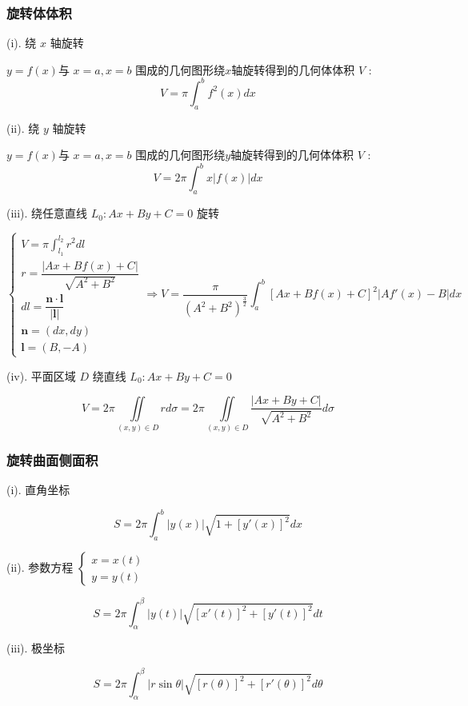 \subsubsection{旋转体体积}
\begin{theorem}[旋转体体积]

	(i). 绕 $x$ 轴旋转

	$y=f(x)$与 $x=a,x=b$ 围成的几何图形绕$x$轴旋转得到的几何体体积 $V$ :
	$$V=\pi\int_{a}^{b}f^{2}(x)dx$$

	(ii). 绕 $y$ 轴旋转

	$y=f(x)$与 $x=a,x=b$ 围成的几何图形绕$y$轴旋转得到的几何体体积 $V$ :
	$$V=2\pi\int_{a}^{b}x|f(x)|dx$$

	(iii). 绕任意直线 $L_{0}: Ax+By+C=0$ 旋转

	$$\begin{cases} 
		V=\pi\int_{l_{1}}^{l_{2}}r^{2}dl \\ 
		r = \dfrac{|Ax+Bf(x)+C|}{\sqrt{A^{2}+B^{2}}}\\
		dl = \dfrac{\boldsymbol{n}\cdot \boldsymbol{l}}{|\boldsymbol{l}|}\\
		\boldsymbol{n} = (dx,dy)\\
		\boldsymbol{l} = (B,-A)
	\end{cases}\Rightarrow V = \dfrac{\pi}{(A^{2}+B^{2})^{\frac{3}{2}}}\int_{a}^{b} \left[Ax+Bf(x)+C\right]^{2}\big|Af'(x)-B\big|dx$$

	(iv). 平面区域 $D$ 绕直线 $L_{0}: Ax+By+C=0$

	$$V = 2\pi\iint\limits_{(x,y)\in D} rd\sigma = 2\pi\iint\limits_{(x,y)\in D} \dfrac{|Ax+By+C|}{\sqrt{A^{2}+B^{2}}}d\sigma$$
\end{theorem}
\subsubsection{旋转曲面侧面积}
\begin{theorem}

	(i). 直角坐标

	$$S = 2\pi\int_{a}^{b}|y(x)|\sqrt{1+[y'(x)]^{2}}dx$$

	(ii). 参数方程 $\begin{cases}
		x=x(t) \\
		y=y(t)
	\end{cases}$

	$$S = 2\pi\int_{\alpha}^{\beta}|y(t)|\sqrt{[x'(t)]^{2}+[y'(t)]^{2}}dt$$

	(iii). 极坐标

	$$S = 2\pi \int_{\alpha}^{\beta}|r\sin\theta|\sqrt{[r(\theta)]^{2}+[r'(\theta)]^{2}}d\theta$$
\end{theorem}
